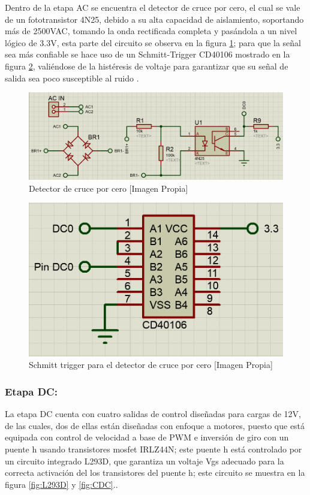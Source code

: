 		Dentro de la etapa AC se encuentra el detector de cruce por cero, el cual se vale de un fototransistor 4N25, debido a su alta capacidad de aislamiento, soportando más de 2500VAC, tomando la onda rectificada completa y pasándola a un nivel lógico de 3.3V, esta parte del circuito se observa en la figura \ref{fig:DC01}; para que la señal sea más confiable se hace uso de un Schmitt-Trigger CD40106 mostrado en la figura \ref{fig:DC02}, valiéndose de la histéresis de voltaje para garantizar que su señal de salida sea poco susceptible al ruido \cite{DC0}.\\
		
		\begin{figure}[H]
			\centering
			\caption{Detector de cruce por cero [Imagen Propia]}
			\label{fig:DC01}
			\includegraphics[width=0.85\linewidth]{Imagenes/DC01}
		\end{figure}
	
		\begin{figure}[H]
			\centering
			\caption{Schmitt trigger para el detector de cruce por cero [Imagen Propia]}
			\label{fig:DC02}
			\includegraphics[width=0.5\linewidth]{Imagenes/DC02}
		\end{figure}
	
	\subsubsection{Etapa DC:}
		La etapa DC cuenta con cuatro salidas de control diseñadas para cargas de 12V, de las cuales, dos de ellas están diseñadas con enfoque a motores, puesto que está equipada con control de velocidad a base de PWM e inversión de giro con un puente h usando transistores mosfet IRLZ44N; este puente h está controlado por un circuito integrado L293D, que garantiza un voltaje Vgs adecuado para la correcta activación del los transistores del puente h; este circuito se muestra en la figura \ref{fig:L293D} y \ref{fig:CDC}.\cite{IRL}.\\
		
